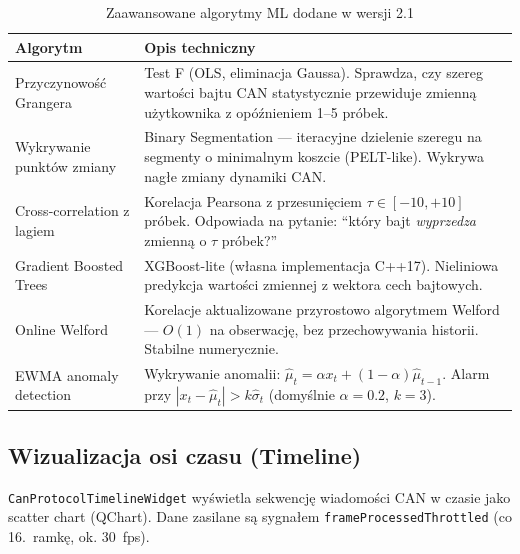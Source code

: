 \documentclass[12pt, a4paper]{article}
\begin{document}
\begin{table}[H]
\caption{Zaawansowane algorytmy ML dodane w wersji 2.1}
\label{tab:mlv21}
\centering
\small
\begin{tabular}{p{5.0cm}p{9.5cm}}
\toprule
\textbf{Algorytm} & \textbf{Opis techniczny} \\
\midrule
Przyczynowość Grangera &
  Test F (OLS, eliminacja Gaussa). Sprawdza, czy szereg wartości bajtu CAN
  statystycznie przewiduje zmienną użytkownika z opóźnieniem 1--5 próbek. \\
Wykrywanie punktów zmiany &
  Binary Segmentation --- iteracyjne dzielenie szeregu na segmenty
  o minimalnym koszcie (PELT-like). Wykrywa nagłe zmiany dynamiki CAN. \\
Cross-correlation z lagiem &
  Korelacja Pearsona z przesunięciem $\tau \in [-10, +10]$ próbek.
  Odpowiada na pytanie: ``który bajt \emph{wyprzedza} zmienną o $\tau$ próbek?'' \\
Gradient Boosted Trees &
  XGBoost-lite (własna implementacja C++17). Nieliniowa predykcja wartości
  zmiennej z wektora cech bajtowych. \\
Online Welford &
  Korelacje aktualizowane przyrostowo algorytmem Welford --- $O(1)$ na
  obserwację, bez przechowywania historii. Stabilne numerycznie. \\
EWMA anomaly detection &
  Wykrywanie anomalii: $\hat{\mu}_{t}=\alpha x_t + (1-\alpha)\hat{\mu}_{t-1}$.
  Alarm przy $|x_t - \hat{\mu}_t| > k\hat{\sigma}_t$ (domyślnie $\alpha=0.2$, $k=3$). \\
\bottomrule
\end{tabular}
\end{table}

\subsection{Wizualizacja osi czasu (Timeline)}

\texttt{CanProtocolTimelineWidget} wyświetla sekwencję wiadomości CAN w czasie
jako scatter chart (QChart). Dane zasilane są sygnałem
\texttt{frameProcessedThrottled} (co 16.~ramkę, ok. 30~fps).
\end{document}
